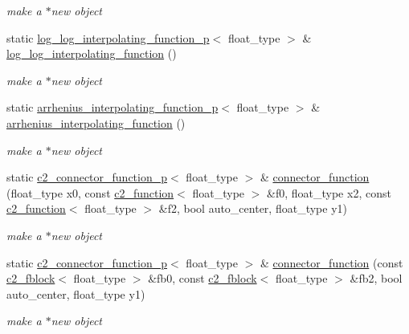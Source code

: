 \begin{DoxyCompactItemize}
\begin{DoxyCompactList}\small\item\em make a $\ast$new object \end{DoxyCompactList}\item 
static \hyperlink{classlog__log__interpolating__function__p}{log\+\_\+log\+\_\+interpolating\+\_\+function\+\_\+p}$<$ float\+\_\+type $>$ \& \hyperlink{classc2__factory_a18b0897567e472e50290fcb1834176d3}{log\+\_\+log\+\_\+interpolating\+\_\+function} ()
\begin{DoxyCompactList}\small\item\em make a $\ast$new object \end{DoxyCompactList}\item 
static \hyperlink{classarrhenius__interpolating__function__p}{arrhenius\+\_\+interpolating\+\_\+function\+\_\+p}$<$ float\+\_\+type $>$ \& \hyperlink{classc2__factory_ac2ab3145f84167194ba1ff71aaaa6ffe}{arrhenius\+\_\+interpolating\+\_\+function} ()
\begin{DoxyCompactList}\small\item\em make a $\ast$new object \end{DoxyCompactList}\item 
static \hyperlink{classc2__connector__function__p}{c2\+\_\+connector\+\_\+function\+\_\+p}$<$ float\+\_\+type $>$ \& \hyperlink{classc2__factory_ac8c9d70e5c486a0025e288e5911f2a55}{connector\+\_\+function} (float\+\_\+type x0, const \hyperlink{classc2__function}{c2\+\_\+function}$<$ float\+\_\+type $>$ \&f0, float\+\_\+type x2, const \hyperlink{classc2__function}{c2\+\_\+function}$<$ float\+\_\+type $>$ \&f2, bool auto\+\_\+center, float\+\_\+type y1)
\begin{DoxyCompactList}\small\item\em make a $\ast$new object \end{DoxyCompactList}\item 
static \hyperlink{classc2__connector__function__p}{c2\+\_\+connector\+\_\+function\+\_\+p}$<$ float\+\_\+type $>$ \& \hyperlink{classc2__factory_a6c6d28aecfe189f6eb513ddd8c8a51e1}{connector\+\_\+function} (const \hyperlink{classc2__fblock}{c2\+\_\+fblock}$<$ float\+\_\+type $>$ \&fb0, const \hyperlink{classc2__fblock}{c2\+\_\+fblock}$<$ float\+\_\+type $>$ \&fb2, bool auto\+\_\+center, float\+\_\+type y1)
\begin{DoxyCompactList}\small\item\em make a $\ast$new object \end{DoxyCompactList}\item 

\end{DoxyCompactItemize}
